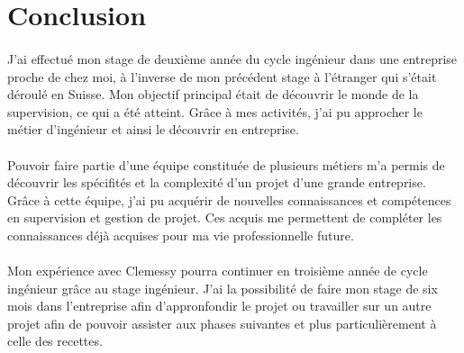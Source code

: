 \section*{Conclusion}
\paragraph{}J'ai effectué mon stage de deuxième année du cycle ingénieur dans une entreprise proche de chez moi, à l'inverse de mon précédent stage à l'étranger qui s'était déroulé en Suisse. Mon objectif principal était de découvrir le monde de la supervision, ce qui a été atteint. Grâce à mes activités, j'ai pu approcher le métier d'ingénieur et ainsi le découvrir en entreprise.
\paragraph{}Pouvoir faire partie d'une équipe constituée de plusieurs métiers m'a permis de découvrir les spécifités et la complexité d'un projet d'une grande entreprise. Grâce à cette équipe, j'ai pu acquérir de nouvelles connaissances et compétences en supervision et gestion de projet. Ces acquis me permettent de compléter les connaissances déjà acquises pour ma vie professionnelle future.
\paragraph{}Mon expérience avec Clemessy pourra continuer en troisième année de cycle ingénieur grâce au stage ingénieur. J'ai la possibilité de faire mon stage de six mois dans l'entreprise afin d'appronfondir le projet ou travailler sur un autre projet afin de pouvoir assister aux phases suivantes et plus particulièrement à celle des recettes.